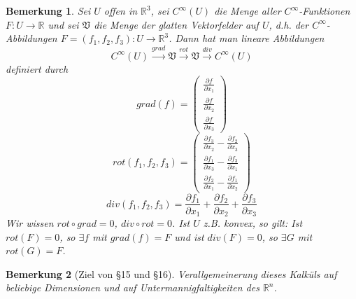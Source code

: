 \documentclass[10pt,a4paper]{report}
\newtheorem*{remark}{Bemerkung}
\begin{document}
\begin{remark}
  Sei $U$ offen in $\mathbb{R}^{3}$, sei $C^{\infty}(U)$ die Menge aller $C^{\infty}$-Funktionen $F : U \rightarrow \mathbb{R}$ und sei $\mathfrak{V}$ die Menge der glatten Vektorfelder auf $U$, d.h. der $C^{\infty}$-Abbildungen $F = (f_{1}, f_{2}, f_{3}) : U \rightarrow \mathbb{R}^{3}$.
  Dann hat man lineare Abbildungen
  \begin{equation}
    C^{\infty}(U) \xrightarrow{grad} \mathfrak{V} \xrightarrow{rot} \mathfrak{V} \xrightarrow{div} C^{\infty}(U)
  \end{equation}
  definiert durch
  \begin{equation}
    grad(f) = \begin{pmatrix}
      \frac{\partial f}{\partial x_{1}}\\
      \frac{\partial f}{\partial x_{2}}\\
      \frac{\partial f}{\partial x_{3}}
    \end{pmatrix}
  \end{equation}
  \begin{equation}
    rot(f_{1}, f_{2}, f_{3}) = \begin{pmatrix}
      \frac{\partial f_{3}}{\partial x_{2}} - \frac{\partial f_{2}}{\partial x_{3}}\\
      \frac{\partial f_{1}}{\partial x_{3}} - \frac{\partial f_{3}}{\partial x_{1}}\\
      \frac{\partial f_{2}}{\partial x_{1}} - \frac{\partial f_{1}}{\partial x_{2}}
    \end{pmatrix}
  \end{equation}
  \begin{equation}
    div(f_{1}, f_{2}, f_{3}) = \frac{\partial f_{1}}{\partial x_{1}} + \frac{\partial f_{2}}{\partial x_{2}} + \frac{\partial f_{3}}{\partial x_{3}}
  \end{equation}
  Wir wissen $rot \circ grad = 0$, $div \circ rot = 0$.
  Ist $U$ z.B. konvex, so gilt: Ist $rot(F) = 0$, so $\exists f$ mit $grad(f) = F$ und ist $div(F) = 0$, so $\exists G$ mit $rot(G) = F$.
\end{remark}

\begin{remark}[Ziel von §15 und §16]
  Verallgemeinerung dieses Kalküls auf beliebige Dimensionen und auf Untermannigfaltigkeiten des $\mathbb{R}^{n}$.
\end{remark}
\end{document}
